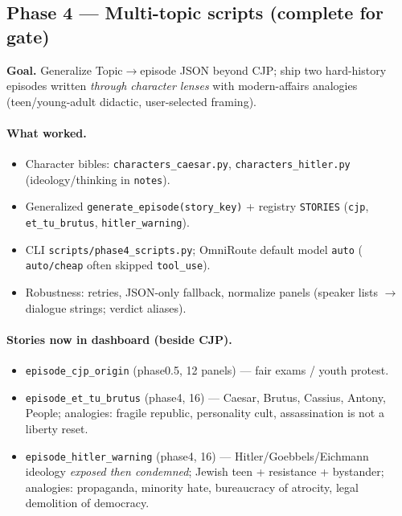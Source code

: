 \documentclass[10pt,twocolumn,letterpaper]{article}
\begin{document}
\subsection{Phase 4 --- Multi-topic scripts (complete for gate)}
\textbf{Goal.} Generalize Topic$\rightarrow$episode JSON beyond CJP; ship two hard-history episodes written \emph{through character lenses} with modern-affairs analogies (teen/young-adult didactic, user-selected framing).

\paragraph{What worked.}
\begin{itemize}[leftmargin=*,itemsep=1pt]
  \item Character bibles: \texttt{characters\_caesar.py}, \texttt{characters\_hitler.py} (ideology/thinking in \texttt{notes}).
  \item Generalized \texttt{generate\_episode(story\_key)} + registry \texttt{STORIES} (\texttt{cjp}, \texttt{et\_tu\_brutus}, \texttt{hitler\_warning}).
  \item CLI \texttt{scripts/phase4\_scripts.py}; OmniRoute default model \texttt{auto} ( \texttt{auto/cheap} often skipped \texttt{tool\_use}).
  \item Robustness: retries, JSON-only fallback, normalize panels (speaker lists $\rightarrow$ dialogue strings; verdict aliases).
\end{itemize}

\paragraph{Stories now in dashboard (beside CJP).}
\begin{itemize}[leftmargin=*,itemsep=1pt]
  \item \texttt{episode\_cjp\_origin} (phase0.5, 12 panels) --- fair exams / youth protest.
  \item \texttt{episode\_et\_tu\_brutus} (phase4, 16) --- Caesar, Brutus, Cassius, Antony, People; analogies: fragile republic, personality cult, assassination is not a liberty reset.
  \item \texttt{episode\_hitler\_warning} (phase4, 16) --- Hitler/Goebbels/Eichmann ideology \emph{exposed then condemned}; Jewish teen + resistance + bystander; analogies: propaganda, minority hate, bureaucracy of atrocity, legal demolition of democracy.
\end{itemize}
\end{document}
